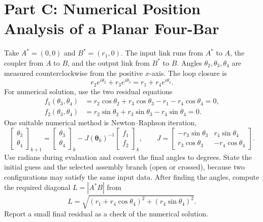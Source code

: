 \documentclass[11pt,a4paper]{article}
\begin{document}
\section{Part C: Numerical Position Analysis of a Planar Four-Bar}
Take $A^*=(0,0)$ and $B^*=(r_1,0)$. The input link runs from $A^*$
to $A$, the coupler from $A$ to $B$, and the output link from $B^*$ to $B$.
Angles $\theta_2,\theta_3,\theta_4$ are measured counterclockwise from
the positive $x$-axis. The loop closure is
\begin{equation}
  r_2 e^{i\theta_2}+r_3 e^{i\theta_3}
  =r_1+r_4 e^{i\theta_4}.
  \label{eq:loop}
\end{equation}
For numerical solution, use the two residual equations
\begin{align}
  f_1(\theta_3,\theta_4)
    &=r_2\cos\theta_2+r_3\cos\theta_3-r_1-r_4\cos\theta_4=0,\\
  f_2(\theta_3,\theta_4)
    &=r_2\sin\theta_2+r_3\sin\theta_3-r_4\sin\theta_4=0.
  \label{eq:residuals}
\end{align}
One suitable numerical method is Newton--Raphson iteration,
\begin{equation}
  \begin{bmatrix}\theta_3\\\theta_4\end{bmatrix}_{k+1}
  =\begin{bmatrix}\theta_3\\\theta_4\end{bmatrix}_{k}
   -J(\boldsymbol\theta_k)^{-1}
    \begin{bmatrix}f_1\\f_2\end{bmatrix}_{k},
  \qquad
  J=\begin{bmatrix}
    -r_3\sin\theta_3 & r_4\sin\theta_4\\
     r_3\cos\theta_3 &-r_4\cos\theta_4
  \end{bmatrix}.
  \label{eq:newton}
\end{equation}
Use radians during evaluation and convert the final angles to degrees.
State the initial guess and the selected assembly branch (open or crossed),
because two configurations may satisfy the same input data. After finding
the angles, compute the required diagonal $L=|A^*B|$ from
\begin{equation}
  L=\sqrt{(r_1+r_4\cos\theta_4)^2+(r_4\sin\theta_4)^2}.
  \label{eq:diagonal}
\end{equation}
Report a small final residual as a check of the numerical solution.
\end{document}
